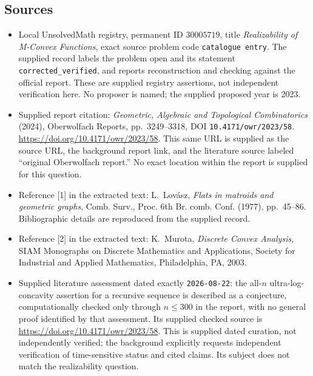 \documentclass[11pt]{article}
\begin{document}
\subsection{Sources}
\begin{itemize}
\item Local UnsolvedMath registry, permanent ID \(30005719\), title \emph{Realizability of M-Convex Functions}, exact source problem code \texttt{catalogue entry}. The supplied record labels the problem open and its statement \texttt{corrected\_verified}, and reports reconstruction and checking against the official report. These are supplied registry assertions, not independent verification here. No proposer is named; the supplied proposed year is 2023.
\item Supplied report citation: \emph{Geometric, Algebraic and Topological Combinatorics} (2024), Oberwolfach Reports, pp.~3249--3318, DOI \texttt{10.4171/owr/2023/58}. \url{https://doi.org/10.4171/owr/2023/58}. This same URL is supplied as the source URL, the background report link, and the literature source labeled ``original Oberwolfach report.'' No exact location within the report is supplied for this question.
\item Reference [1] in the extracted text: L.~Lov\'asz, \emph{Flats in matroids and geometric graphs}, Comb. Surv., Proc. 6th Br. comb. Conf. (1977), pp.~45--86. Bibliographic details are reproduced from the supplied record.
\item Reference [2] in the extracted text: K.~Murota, \emph{Discrete Convex Analysis}, SIAM Monographs on Discrete Mathematics and Applications, Society for Industrial and Applied Mathematics, Philadelphia, PA, 2003.
\item Supplied literature assessment dated exactly \texttt{2026-08-22}: the all-\(n\) ultra-log-concavity assertion for a recursive sequence is described as a conjecture, computationally checked only through \(n\leq300\) in the report, with no general proof identified by that assessment. Its supplied checked source is \url{https://doi.org/10.4171/owr/2023/58}. This is supplied dated curation, not independently verified; the background explicitly requests independent verification of time-sensitive status and cited claims. Its subject does not match the realizability question.
\end{itemize}
\end{document}
